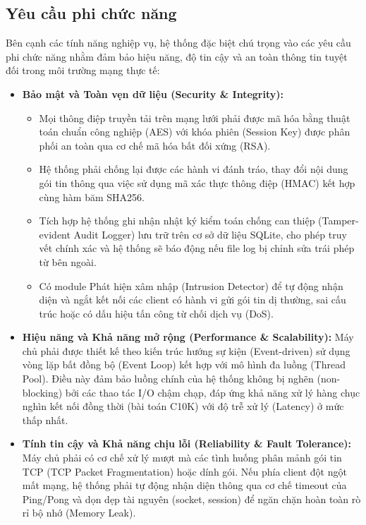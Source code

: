 \subsection{Yêu cầu phi chức năng}

Bên cạnh các tính năng nghiệp vụ, hệ thống đặc biệt chú trọng vào các yêu cầu phi chức năng nhằm đảm bảo hiệu năng, độ tin cậy và an toàn thông tin tuyệt đối trong môi trường mạng thực tế:

\begin{itemize}
    \item \textbf{Bảo mật và Toàn vẹn dữ liệu (Security \& Integrity):}
    \begin{itemize}
        \item Mọi thông điệp truyền tải trên mạng lưới phải được mã hóa bằng thuật toán chuẩn công nghiệp (AES) với khóa phiên (Session Key) được phân phối an toàn qua cơ chế mã hóa bất đối xứng (RSA).
        \item Hệ thống phải chống lại được các hành vi đánh tráo, thay đổi nội dung gói tin thông qua việc sử dụng mã xác thực thông điệp (HMAC) kết hợp cùng hàm băm SHA256.
        \item Tích hợp hệ thống ghi nhận nhật ký kiểm toán chống can thiệp (Tamper-evident Audit Logger) lưu trữ trên cơ sở dữ liệu SQLite, cho phép truy vết chính xác và hệ thống sẽ báo động nếu file log bị chỉnh sửa trái phép từ bên ngoài.
        \item Có module Phát hiện xâm nhập (Intrusion Detector) để tự động nhận diện và ngắt kết nối các client có hành vi gửi gói tin dị thường, sai cấu trúc hoặc có dấu hiệu tấn công từ chối dịch vụ (DoS).
    \end{itemize}
    \item \textbf{Hiệu năng và Khả năng mở rộng (Performance \& Scalability):} Máy chủ phải được thiết kế theo kiến trúc hướng sự kiện (Event-driven) sử dụng vòng lặp bất đồng bộ (Event Loop) kết hợp với mô hình đa luồng (Thread Pool). Điều này đảm bảo luồng chính của hệ thống không bị nghẽn (non-blocking) bởi các thao tác I/O chậm chạp, đáp ứng khả năng xử lý hàng chục nghìn kết nối đồng thời (bài toán C10K) với độ trễ xử lý (Latency) ở mức thấp nhất.
    \item \textbf{Tính tin cậy và Khả năng chịu lỗi (Reliability \& Fault Tolerance):} Máy chủ phải có cơ chế xử lý mượt mà các tình huống phân mảnh gói tin TCP (TCP Packet Fragmentation) hoặc dính gói. Nếu phía client đột ngột mất mạng, hệ thống phải tự động nhận diện thông qua cơ chế timeout của Ping/Pong và dọn dẹp tài nguyên (socket, session) để ngăn chặn hoàn toàn rò rỉ bộ nhớ (Memory Leak).
\end{itemize}
